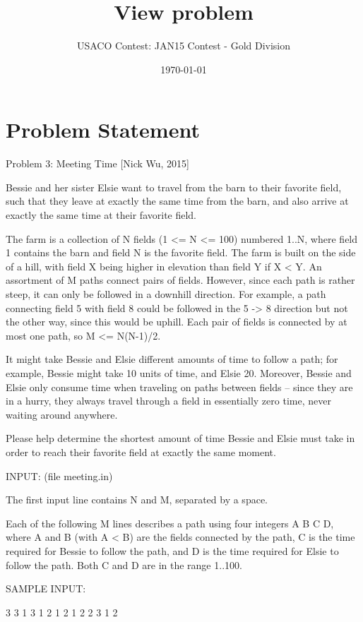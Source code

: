 \documentclass[12pt]{article}
\title{View problem}
\author{USACO Contest: JAN15 Contest - Gold Division}
\date{\today}
\begin{document}
\maketitle

\section*{Problem Statement}

Problem 3: Meeting Time [Nick Wu, 2015]

Bessie and her sister Elsie want to travel from the barn to their
favorite field, such that they leave at exactly the same time from the
barn, and also arrive at exactly the same time at their favorite
field.

The farm is a collection of N fields (1 <= N <= 100) numbered 1..N,
where field 1 contains the barn and field N is the favorite field.
The farm is built on the side of a hill, with field X being higher in
elevation than field Y if X < Y.  An assortment of M paths connect
pairs of fields.  However, since each path is rather steep, it can
only be followed in a downhill direction. For example, a path
connecting field 5 with field 8 could be followed in the 5 -> 8
direction but not the other way, since this would be uphill.  Each
pair of fields is connected by at most one path, so M <= N(N-1)/2.

It might take Bessie and Elsie different amounts of time to follow a
path; for example, Bessie might take 10 units of time, and Elsie 20.
Moreover, Bessie and Elsie only consume time when traveling on paths
between fields -- since they are in a hurry, they always travel
through a field in essentially zero time, never waiting around
anywhere.

Please help determine the shortest amount of time Bessie and Elsie
must take in order to reach their favorite field at exactly the same
moment.

INPUT: (file meeting.in)

The first input line contains N and M, separated by a space.

Each of the following M lines describes a path using four integers A B
C D, where A and B (with A < B) are the fields connected by the path,
C is the time required for Bessie to follow the path, and D is the
time required for Elsie to follow the path.  Both C and D are in the
range 1..100.

SAMPLE INPUT:

3 3
1 3 1 2
1 2 1 2
2 3 1 2
\end{document}
